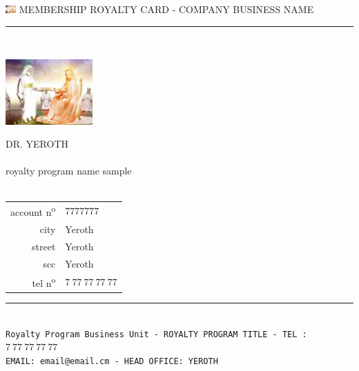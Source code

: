 \documentclass[11pt,a4paper]{memoir}
\begin{document}
    \begin{Spacing}{0.75}%
    \noindent
	\includegraphics[height=3mm]{../YEROTH-NISSI.JPG}
	{\tiny \emptyset \hfill \textcolor{yerothColorGold}{MEMBERSHIP ROYALTY CARD - COMPANY BUSINESS NAME}}\\
    \vspace{-0.25em}
    \rule{74mm}{.3mm}\\
    \begin{minipage}[t]{33mm}
        \vspace{-0mm}%
        \includegraphics[height=25mm]{../YEROTH-NISSI.JPG}
    \end{minipage}
    \hspace{1mm}
    \begin{minipage}[t]{42mm}
        \vspace{-0mm}%
        \begin{flushleft}
        {\scriptsize
            \begin{Spacing}{1}%
            \textcolor{yerothColorGold}{DR. YEROTH}\\
            \hspace{5mm} \\
            \hspace{5mm} royalty program name sample \\
            \hspace{5mm} \vspace{2mm}\\
            \end{Spacing}
        }
        {\tiny
        	\begin{tabular}{rl}
            	{\color{gray}account n\textsuperscript{o}} & $7777777$\\
            	{\color{gray}city} & Yeroth\\
            	{\color{gray}street} & Yeroth\\
            	{\color{gray}scc} & Yeroth\\
            	{\color{gray}tel n\textsuperscript{o}} & $7\ 77\ 77\ 77\ 77$\\
            \end{tabular}
            \vspace*{2mm}
        }
        \end{flushleft}
    \end{minipage}
    \rule{74mm}{0mm}\\
    \vspace{-0.45em}
    \hspace*{-0.45em}
    \texttt{\fontsize{1.83mm}{3.55mm}\selectfont Royalty Program Business Unit - ROYALTY PROGRAM TITLE - TEL : $7\ 77\ 77\ 77\ 77$}\\
    \hspace*{-0.27em}
    \texttt{\fontsize{1.83mm}{3.55mm}\selectfont EMAIL: email@email.cm - HEAD OFFICE: YEROTH}
    \end{Spacing}
\end{document}
